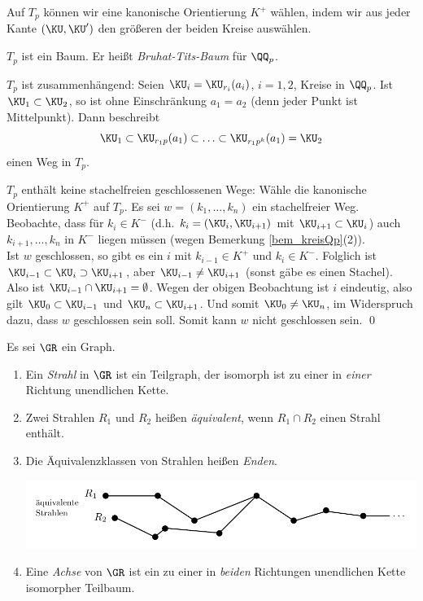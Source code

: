 Auf $T_p$ können wir eine kanonische Orientierung $K^+$ wählen,
indem wir aus jeder Kante $(\KU,\KU')$ den größeren der beiden Kreise
auswählen.

\BEM $T_p$ ist ein Baum. Er heißt \emph{Bruhat-Tits-Baum}
für $\QQ_p$.

\bew $T_p$ ist zusammenhängend: Seien $\KU_i=\KU_{r_i}(a_i)$, $i=1,2$,
Kreise in $\QQ_p$. Ist $\KU_1\subset \KU_2$, so ist ohne Einschränkung
$a_1=a_2$ (denn jeder Punkt ist Mittelpunkt). Dann beschreibt
\[
\KU_1 \subset \KU_{r_1 p}(a_1) \subset \ldots \subset
\KU_{r_1 p^k}(a_1)=\KU_2
\]
einen Weg in $T_p$.

$T_p$ enthält keine stachelfreien geschlossenen Wege: Wähle die
kanonische Orientierung $K^+$ auf $T_p$.
Es sei $w=(k_1,\ldots,k_n)$ ein stachelfreier Weg.
Beobachte, dass für $k_i\in K^-$ (d.h. $k_i=(\KU_i,\KU_{i+1})$
mit $\KU_{i+1} \subset \KU_i$) auch $k_{i+1},\ldots,k_n$ in $K^-$
liegen müssen (wegen Bemerkung \ref{bem_kreisQp}(2)).\\
Ist $w$ geschlossen, so gibt es ein $i$ mit $k_{i-1}\in K^+$ und
$k_i\in K^-$.
Folglich ist $\KU_{i-1}\subset \KU_i \supset \KU_{i+1}$, aber
$\KU_{i-1}\neq\KU_{i+1}$ (sonst gäbe es einen Stachel).
Also ist $\KU_{i-1}\cap \KU_{i+1}=\emptyset$. Wegen der obigen
Beobachtung ist $i$ eindeutig, also gilt
$\KU_0\subset \KU_{i-1}$ und $\KU_n\subset \KU_{i+1}$.
Und somit $\KU_0\neq \KU_n$, im Widerspruch dazu, dass $w$ geschlossen
sein soll. Somit kann $w$ nicht geschlossen sein.
\qed

\DEF Es sei $\GR$ ein Graph.
\begin{enumerate}
\item Ein \emph{Strahl} in $\GR$ ist ein Teilgraph,
der isomorph ist zu einer in \textsl{einer} Richtung unendlichen
Kette.
\item Zwei Strahlen $R_1$ und $R_2$ heißen \emph{äquivalent},
wenn $R_1\cap R_2$ einen Strahl enthält.
\item Die Äquivalenzklassen von Strahlen heißen \emph{Enden}.
\begin{center}
	\includegraphics{grugraImages/R1R2}
\end{center}
\item Eine \emph{Achse} von $\GR$ ist ein
zu einer in \textsl{beiden} Richtungen unendlichen Kette isomorpher
Teilbaum.
\end{enumerate}

